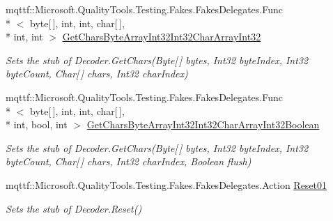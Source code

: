\begin{DoxyCompactItemize}
mqttf\-::\-Microsoft.\-Quality\-Tools.\-Testing.\-Fakes.\-Fakes\-Delegates.\-Func\\*
$<$ byte\mbox{[}$\,$\mbox{]}, int, int, char\mbox{[}$\,$\mbox{]}, \\*
int, int $>$ \hyperlink{class_system_1_1_text_1_1_fakes_1_1_stub_decoder_a38b7c2549e0ade7ce097b4ff60446ed1}{Get\-Chars\-Byte\-Array\-Int32\-Int32\-Char\-Array\-Int32}
\begin{DoxyCompactList}\small\item\em Sets the stub of Decoder.\-Get\-Chars(\-Byte\mbox{[}$\,$\mbox{]} bytes, Int32 byte\-Index, Int32 byte\-Count, Char\mbox{[}$\,$\mbox{]} chars, Int32 char\-Index)\end{DoxyCompactList}\item 
mqttf\-::\-Microsoft.\-Quality\-Tools.\-Testing.\-Fakes.\-Fakes\-Delegates.\-Func\\*
$<$ byte\mbox{[}$\,$\mbox{]}, int, int, char\mbox{[}$\,$\mbox{]}, \\*
int, bool, int $>$ \hyperlink{class_system_1_1_text_1_1_fakes_1_1_stub_decoder_a08eacdff8bb666653e9d32206470e759}{Get\-Chars\-Byte\-Array\-Int32\-Int32\-Char\-Array\-Int32\-Boolean}
\begin{DoxyCompactList}\small\item\em Sets the stub of Decoder.\-Get\-Chars(\-Byte\mbox{[}$\,$\mbox{]} bytes, Int32 byte\-Index, Int32 byte\-Count, Char\mbox{[}$\,$\mbox{]} chars, Int32 char\-Index, Boolean flush)\end{DoxyCompactList}\item 
mqttf\-::\-Microsoft.\-Quality\-Tools.\-Testing.\-Fakes.\-Fakes\-Delegates.\-Action \hyperlink{class_system_1_1_text_1_1_fakes_1_1_stub_decoder_ac3482ae19a17d145e901cef9f3dba7e9}{Reset01}
\begin{DoxyCompactList}\small\item\em Sets the stub of Decoder.\-Reset()\end{DoxyCompactList}\end{DoxyCompactItemize}

